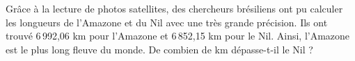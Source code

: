 \documentclass[exercice]{thedocument}%
\begin{document}
%
Grâce à la lecture de photos satellites, des chercheurs brésiliens ont pu
calculer les longueurs de l'Amazone et du Nil avec une très grande précision.
Ils ont trouvé 6\,992,06 km pour l'Amazone et 6\,852,15 km pour le Nil. Ainsi,
l'Amazone est le plus long fleuve du monde.\vskip10pt De combien de km
dépasse-t-il le Nil ?
\end{document}
